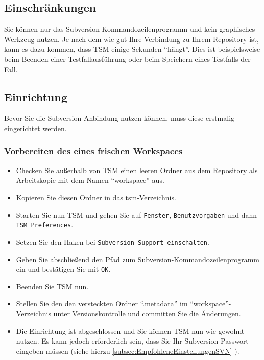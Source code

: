 \documentclass[11pt,a4paper,titlepage]{article}
\begin{document}
\subsection{Einschränkungen}
Sie können nur das Subversion-Kommandozeilenprogramm und kein graphisches Werkzeug nutzen.
Je nach dem wie gut Ihre Verbindung zu Ihrem Repository ist, kann es dazu kommen, dass TSM einige Sekunden "`hängt"'.
Dies ist beispielsweise beim Beenden einer Testfallausführung oder beim Speichern eines Testfalls der Fall.

\subsection{Einrichtung}
Bevor Sie die Subversion-Anbindung nutzen können, muss diese erstmalig eingerichtet werden.

\subsubsection{Vorbereiten des eines frischen Workspaces}
\begin{itemize}
 \item Checken Sie außerhalb von TSM einen leeren Ordner aus dem Repository als Arbeitskopie mit dem Namen "`workspace"' aus.
 \item Kopieren Sie diesen Ordner in das tsm-Verzeichnis.
 \item Starten Sie nun TSM und gehen Sie auf \texttt{Fenster}, \texttt{Benutzvorgaben} und dann \texttt{TSM Preferences}.
 \item Setzen Sie den Haken bei \texttt{Subversion-Support einschalten}.
 \item Geben Sie abschließend den Pfad zum Subversion-Kommandozeilenprogramm ein und bestätigen Sie mit \texttt{OK}.
 \item Beenden Sie TSM nun.
 \item Stellen Sie den den versteckten Ordner "`.metadata"' im "`workspace"'-Verzeichnis unter Versionskontrolle und committen Sie die Änderungen.
 \item Die Einrichtung ist abgeschlossen und Sie können TSM nun wie gewohnt nutzen. Es kann jedoch erforderlich sein, dass Sie Ihr Subversion-Passwort eingeben müssen 
 (siehe hierzu \ref{subsec:EmpfohleneEinstellungenSVN} ).
\end{itemize}
\end{document}
